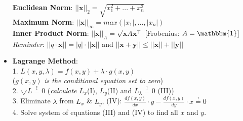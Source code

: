 \documentclass[english]{latex4ei/latex4ei_sheet}
\begin{document}
\begin{itemize}
    \textbf{Euclidean Norm}: $||\mathbf{x}||_2=\sqrt{x_1^2+...+x_n^2}$\\
    \textbf{Maximum Norm}: $||\mathbf{x}||_{\infty}=max(|x_1|,...,|x_n|)$\\
    \textbf{Inner Product Norm}: $||\mathbf{x}||_A=\sqrt{\mathbf{x}A\mathbf{x}^{\top}}$  [Frobenius: $A=\mathbbm{1}$]\\
    \emph{Reminder}: $||q\cdot\mathbf{x}||=|q|\cdot||\mathbf{x}||$ and $||\mathbf{x}+\mathbf{y}||\le||\mathbf{x}||+||\mathbf{y}||$
    \item \textbf{Lagrange Method}:\\
    1. $L(x,y,\lambda)=f(x,y)+\lambda\cdot g(x,y)$ \\($g(x,y)$ \emph{is the conditional equation set to zero})\\
    2. $\bigtriangledown L\overset{!}{=}0$ (\emph{calculate} $L_x$(\textrm{I}), $L_y$(\textrm{II}) and $L_{\lambda}\overset{!}{=}0$ (\textrm{III}))\\
    3. Eliminate $\lambda$ from $L_x$ \& $L_y$, (\textrm{IV}): $\frac{df(x,y)}{dx}\cdot y-\frac{df(x,y)}{dy}\cdot x\overset{!}{=}0$\\
    4. Solve system of equations (\textrm{III}) and (\textrm{IV}) to find all $x$ and $y$.
\end{itemize}


\newpage
\end{document}
